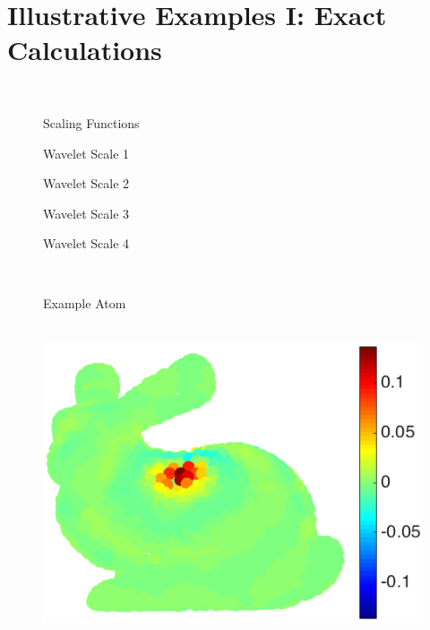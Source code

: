 \documentclass[journal, 10pt]{IEEEtran}
\begin{document}
\section{Illustrative Examples I: Exact Calculations} \label{Se:ill1}


\begin{figure}[bth] 
\begin{minipage}[m]{0.16\linewidth}
~
\end{minipage}
\begin{minipage}[m]{0.16\linewidth}
\centerline{\small{Scaling Functions}}
\end{minipage}
\hspace{.01\linewidth}
\begin{minipage}[m]{0.16\linewidth}
\centerline{\small{Wavelet Scale 1~~~~}}
\end{minipage}
\begin{minipage}[m]{0.16\linewidth}
\centerline{\small{Wavelet Scale 2~~~~}}\end{minipage}
\begin{minipage}[m]{0.16\linewidth}
\centerline{\small{Wavelet Scale 3~~~~}}\end{minipage}
\begin{minipage}[m]{0.16\linewidth}
\centerline{\small{Wavelet Scale 4~~~~~}}\end{minipage} \\
\begin{minipage}[m]{0.16\linewidth}
\centerline{\small{Example Atom}}
\end{minipage}
\begin{minipage}[m]{0.16\linewidth}
\centerline{~~\includegraphics[width=.85\linewidth]{fig_bunny_atom_scalinga}}
\end{minipage}
\begin{minipage}[m]{0.16\linewidth}

\end{minipage}
\end{figure}
\end{document}
